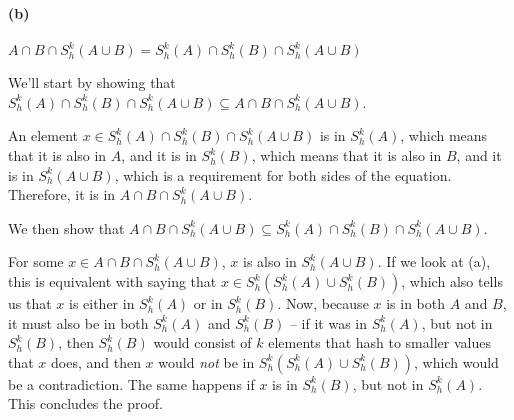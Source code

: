 \paragraph*{(b)}
$A \cap B \cap S^k_h(A \cup B) = S^k_h(A) \cap S^k_h(B) \cap S^k_h(A \cup B)$

We'll start by showing that $S^k_h(A) \cap S^k_h(B) \cap S^k_h(A \cup B) \subseteq A \cap B \cap S^k_h(A \cup B)$.

An element $x \in S^k_h(A) \cap S^k_h(B) \cap S^k_h(A \cup B)$ is in $S^k_h(A)$, which means that it is also in $A$, and it is in $S^k_h(B)$, which means that it is also in $B$, and it is in $S^k_h(A \cup B)$, which is a requirement for both sides of the equation. Therefore, it is in $A \cap B \cap S^k_h(A \cup B)$.

We then show that $A \cap B \cap S^k_h(A \cup B) \subseteq S^k_h(A) \cap S^k_h(B) \cap S^k_h(A \cup B)$.

For some $x \in A \cap B \cap S^k_h(A \cup B)$, $x$ is also in $S^k_h(A \cup B)$. If we look at (a), this is equivalent with saying that $x \in S^k_h(S^k_h(A) \cup S^k_h(B))$, which also tells us that $x$ is either in $S^k_h(A)$ or in $S^k_h(B)$. Now, because $x$ is in both $A$ and $B$, it must also be in both $S^k_h(A)$ and $S^k_h(B)$ -- if it was in $S^k_h(A)$, but not in $S^k_h(B)$, then $S^k_h(B)$ would consist of $k$ elements that hash to smaller values that $x$ does, and then $x$ would \emph{not} be in $S^k_h(S^k_h(A) \cup S^k_h(B))$, which would be a contradiction. The same happens if $x$ is in $S^k_h(B)$, but not in $S^k_h(A)$. This concludes the proof.
